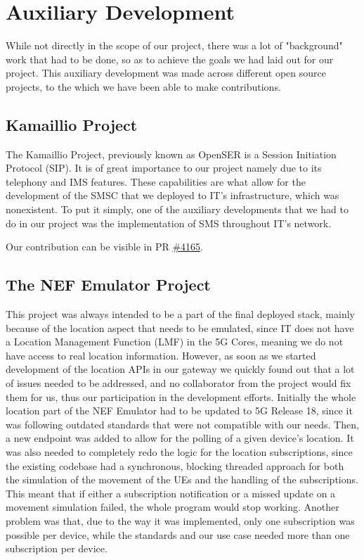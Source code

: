 \chapter{Auxiliary Development}

While not directly in the scope of our project, there was a lot
of "background" work that had to be done, so as to achieve the
goals we had laid out for our project. This auxiliary development
was made across different open source projects, to the which we
have been able to make contributions.

\section{Kamaillio Project}

The Kamaillio Project, previously known as OpenSER is a Session Initiation
Protocol (SIP). It is of great importance to our project namely due to its
telephony and IMS features. These capabilities are what allow for the
development of the SMSC that we deployed to IT's infrastructure, which was
nonexistent. To put it simply, one of the auxiliary developments that we had to
do in our project was the implementation of SMS throughout IT's network.

Our contribution can be visible in PR
\href{https://github.com/kamailio/kamailio/pull/4165}{\#4165}.

\section{The NEF Emulator Project}

This project was always intended to be a part of the final deployed stack,
mainly because of the location aspect that needs to be emulated, since IT does
not have a Location Management Function (LMF) in the 5G Cores, meaning we do
not have access to real location information. However, as soon as we started
development of the location APIs in our gateway we quickly found out that a lot
of issues needed to be addressed, and no collaborator from the project would
fix them for us, thus our participation in the development efforts. Initially
the whole location part of the NEF Emulator had to be updated to 5G Release 18,
since it was following outdated standards that were not compatible with our
needs. Then, a new endpoint was added to allow for the polling of a given
device's location. It was also needed to completely redo the logic for the
location subscriptions, since the existing codebase had a synchronous, blocking
threaded approach for both the simulation of the movement of the UEs and the
handling of the subscriptions. This meant that if either a subscription
notification or a missed update on a movement simulation failed, the whole
program would stop working. Another problem was that, due to the way it was
implemented, only one subscription was possible per device, while the standards
and our use case needed more than one subscription per device.

